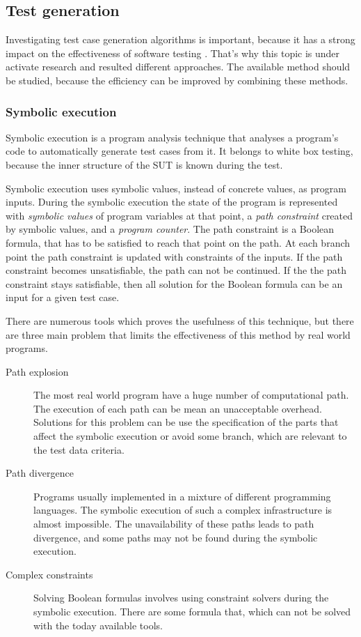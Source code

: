 \subsection{Test generation}
\label{sub:testgeneration}

Investigating test case generation algorithms is important, because it has a strong impact on the effectiveness of software testing \cite{testcasegen} \cite{mbttestcasegeneration}. That's why this topic is under activate research and resulted different approaches. The available method should be studied, because the efficiency can be improved by combining these methods.

\subsubsection{Symbolic execution}
\label{ssub:symbolicexecution}

Symbolic execution is a program analysis technique that analyses a program’s code to automatically generate test cases from it. It belongs to white box testing, because the inner structure of the SUT is known during the test.

Symbolic execution uses symbolic values, instead of concrete values, as program inputs. During the symbolic execution the state of the program is represented with \textit{symbolic values} of program variables at that point, a \textit{path constraint} created by symbolic values, and a \textit{program counter}. The path constraint is a Boolean formula, that has to be satisfied to reach that point on the path. At each branch point the path constraint is updated with constraints of the inputs. If the path constraint becomes unsatisfiable, the path can not be continued. If the the path constraint stays satisfiable, then all solution for the Boolean formula can be an input for a given test case.

There are numerous tools which proves the usefulness of this technique, but there are three main problem that limits the effectiveness of this method by real world programs.

\begin{description}
	\item[Path explosion] The most real world program have a huge number of computational path. The execution of each path can be mean an unacceptable overhead. Solutions for this problem can be use the specification of the parts that affect the symbolic execution or avoid some branch, which are relevant to the test data criteria.
	\item[Path divergence] Programs usually implemented in a mixture of different programming languages. The symbolic execution of such a complex infrastructure is almost impossible. The unavailability of these paths leads to path divergence, and some paths may not be found during the symbolic execution.
	\item[Complex constraints] Solving Boolean formulas involves using constraint solvers during the symbolic execution. There are some formula that, which can not be solved with the today available tools.
\end{description}

